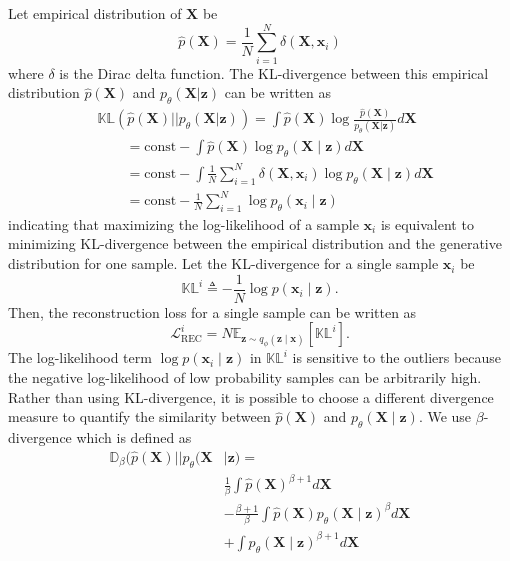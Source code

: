 \documentclass{article}
\def\bx{\mathbf{x}}
\def\bX{\mathbf{X}}
\def\bz{\mathbf{z}}
\theoremstyle{plain}
\theoremstyle{definition}
\begin{document}
Let empirical distribution of $\bX$ be
\begin{equation}
\hat{p}(\bX) = \frac{1}{N} \sum_{i=1}^N \delta(\bX, \bx_i)
\end{equation}
where $\delta$ is the Dirac delta function. The KL-divergence between this empirical distribution $\hat{p}(\bX)$ and $p_{\theta}(\bX | \bz)$ can be written as
\begin{equation}
\begin{split}
 & \mathbb{KL}\left(\hat{p}(\bX) || p_{\theta}(\bX | \bz)  \right) = \int \hat{p}(\bX) \log \frac{\hat{p}(\bX)}{p_{\theta}(\bX | \bz)} d \bX  \\
& \quad \quad = \textrm{const} - \int \hat{p}(\bX) \log p_{\theta} (\bX \mid \bz) d \bX  \\
& \quad \quad = \textrm{const} - \int \frac{1}{N} \sum_{i=1}^N \delta(\bX, \bx_i) \log p_{\theta}(\bX \mid \bz) d \bX \\
& \quad \quad = \textrm{const} - \frac{1}{N} \sum_{i=1}^N \log p_{\theta}(\bx_i \mid \bz)
\end{split}
\end{equation}
indicating that maximizing the log-likelihood of a sample $\bx_i$ is equivalent to minimizing KL-divergence between the empirical distribution and the generative distribution for one sample. Let the KL-divergence for a single sample $\bx_i$ be
\begin{equation}
\mathbb{KL}^i \triangleq -\frac{1}{N} \log p(\bx_i \mid \bz).
\end{equation}
Then, the reconstruction loss for a single sample can be written as
\begin{equation}
\mathcal{L}_{\textrm{REC}}^i = N \mathbb{E}_{\bz \sim q_{\phi}(\bz \mid \bx)} \left [ \mathbb{KL}^i \right ].
\end{equation}
The log-likelihood term $ \log p(\bx_i \mid \bz)$ in $\mathbb{KL}^i$ is sensitive to the outliers because the negative log-likelihood of low probability samples can be arbitrarily high. Rather than using KL-divergence, it is possible to choose a different divergence measure to quantify the similarity between $\hat{p}(\bX)$ and $p_{\theta} (\bX \mid \bz)$. We use $\beta$-divergence which is defined as
\begin{equation}
\begin{split}
\mathbb{D}_{\beta}(\hat{p}(\bX) ||  p_{\theta} (\bX & \mid \bz) = \\
 & \frac{1}{\beta} \int \hat{p}(\bX)^{\beta + 1} d \bX \\
&  - \frac{\beta + 1}{\beta} \int \hat{p}(\bX) p_{\theta}(\bX \mid \bz)^{\beta} d \bX \\
&  + \int p_{\theta}(\bX \mid \bz)^{\beta + 1} d \bX
\end{split}
\end{equation}
\end{document}
